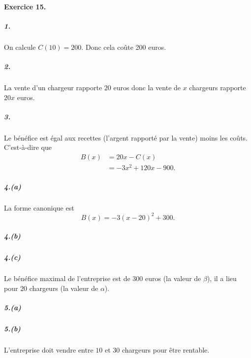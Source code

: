 \documentclass[11pt]{article}
\begin{document}
\newpage
\paragraph{Exercice 15.}
\subparagraph{1.}
On calcule $C(10)=200$. Donc cela coûte 200 euros.

\subparagraph{2.}
La vente d'un chargeur rapporte $20$ euros donc la vente de $x$ chargeurs
rapporte $20x$ euros.

\subparagraph{3.}
Le bénéfice est égal aux recettes (l'argent rapporté par la vente) moins les
coûts. C'est-à-dire que
\begin{align*}
  B(x) &= 20x - C(x) \\
  &= -3x^2+120x-900.
\end{align*}
\subparagraph{4.(a)}
La forme canonique est
\[
  B(x) = -3\left( x-20 \right)^2+300.
\]
\subparagraph{4.(b)}
\begin{center}
\end{center}

\subparagraph{4.(c)}
Le bénéfice maximal de l'entreprise est de $300$ euros (la valeur de $\beta$),
il a lieu pour $20$ chargeurs (la valeur de $\alpha$).

\subparagraph{5.(a)}
\begin{center}
\end{center}

\subparagraph{5.(b)}
L'entreprise doit vendre entre $10$ et $30$ chargeurs pour être rentable.
\end{document}
